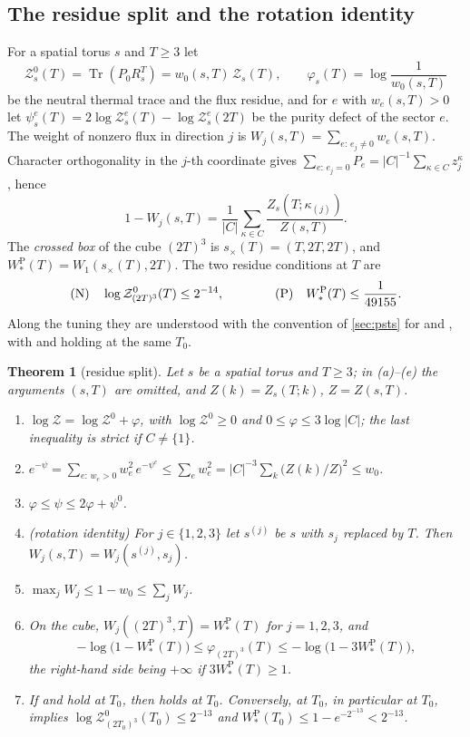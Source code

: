 \documentclass[11pt,a4paper]{amsart}
\newtheorem{theorem}{Theorem}[section]
\theoremstyle{definition}
\theoremstyle{remark}
\numberwithin{equation}{section}
\DeclareMathOperator{\Tr}{Tr}        %
\newcommand{\abs}[1]{\lvert #1\rvert}      %
\newcommand{\TT}{\mathbb{T}}               %
\newcommand{\Zpart}[2]{Z(#1,#2)}           %
\newcommand{\Zc}{\mathcal{Z}}              %
\newcommand{\Zs}[2]{\Zc_{#1}(#2)}          %
\newcommand{\cube}[1]{(2#1)^3}             %
\newcommand{\Mcirc}{\text{\upshape(M$^{\circ}$)}}   %
\newcommand{\Bcirc}{\text{\upshape(B$^{\circ}$)}}   %
\newcommand{\hypN}{\text{\upshape(N)}}              %
\newcommand{\hypP}{\text{\upshape(P)}}              %
\begin{document}
\subsection{The residue split and the rotation identity}

For a spatial torus $s$ and $T\ge3$ let
\[
\Zc^0_s(T)=\Tr(P_0R_s^T)=w_0(s,T)\,\Zs{s}{T},\qquad \varphi_s(T)=\log\frac1{w_0(s,T)}
\]
be the neutral thermal trace and the flux residue, and for $e$ with $w_e(s,T)>0$ let $\psi^e_s(T)=2\log\Zc^e_s(T)-\log\Zc^e_s(2T)$ be the purity defect of the sector $e$. The weight of nonzero flux in direction $j$ is $W_j(s,T)=\sum_{e:\,e_j\ne0}w_e(s,T)$. Character orthogonality in the $j$-th coordinate gives $\sum_{e:\,e_j=0}P_e=\abs{C}^{-1}\sum_{\kappa\in C}z_j^\kappa$, hence
\begin{equation}\label{eq:cg-Wj}
1-W_j(s,T)=\frac1{\abs{C}}\sum_{\kappa\in C}\frac{Z_s(T;\kappa_{(j)})}{\Zpart{s}{T}} .
\end{equation}
The \emph{crossed box} of the cube $\cube T$ is $s_\times(T)=(T,2T,2T)$, and $W^{\mathrm P}_*(T)=W_1(s_\times(T),2T)$. The two residue conditions at $T$ are
\begin{equation}\label{eq:cg-NP}
\hypN\quad\log\Zc^0_{\cube T}(T)\le2^{-14},\qquad\qquad \hypP\quad W^{\mathrm P}_*(T)\le\frac1{49155}.
\end{equation}
Along the tuning they are understood with the convention of \cref{sec:psts} for \Mcirc{} and \Bcirc, with \hypN{} and \hypP{} holding at the same $T_0$.

\begin{theorem}[residue split]\label{thm:residue-split}
Let $s$ be a spatial torus and $T\ge3$; in \textup{(a)--(e)} the arguments $(s,T)$ are omitted, and $Z(k)=Z_s(T;k)$, $Z=\Zpart{s}{T}$.
\begin{enumerate}[label=\textup{(\alph*)},leftmargin=*]
\item $\log\Zc=\log\Zc^0+\varphi$, with $\log\Zc^0\ge0$ and $0\le\varphi\le3\log\abs{C}$; the last inequality is strict if $C\ne\{1\}$.
\item $e^{-\psi}=\sum_{e:\,w_e>0}w_e^2\,e^{-\psi^e}\le\sum_ew_e^2=\abs{C}^{-3}\sum_k\bigl(Z(k)/Z\bigr)^2\le w_0$.
\item $\varphi\le\psi\le2\varphi+\psi^0$.
\item \textup{(rotation identity)} For $j\in\{1,2,3\}$ let $s^{(j)}$ be $s$ with $s_j$ replaced by $T$. Then $W_j(s,T)=W_j(s^{(j)},s_j)$.
\item $\max_jW_j\le1-w_0\le\sum_jW_j$.
\item On the cube, $W_j(\cube T,T)=W^{\mathrm P}_*(T)$ for $j=1,2,3$, and
\[
-\log\bigl(1-W^{\mathrm P}_*(T)\bigr)\le\varphi_{\cube T}(T)\le-\log\bigl(1-3W^{\mathrm P}_*(T)\bigr),
\]
the right-hand side being $+\infty$ if $3W^{\mathrm P}_*(T)\ge1$.
\item If \hypN{} and \hypP{} hold at $T_0$, then \Bcirc{} holds at $T_0$. Conversely, \Bcirc{} at $T_0$, in particular \Mcirc{} at $T_0$, implies $\log\Zc^0_{\cube{T_0}}(T_0)\le2^{-13}$ and $W^{\mathrm P}_*(T_0)\le1-e^{-2^{-13}}<2^{-13}$.
\end{enumerate}
\end{theorem}
\end{document}
